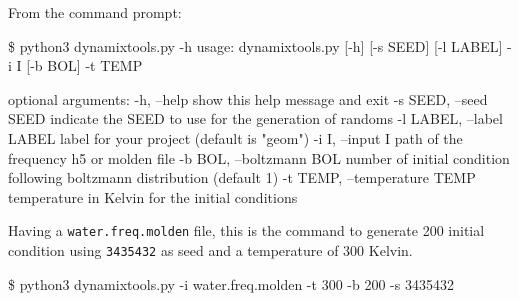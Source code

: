 From the command prompt:
\begin{inputlisting}
\$ python3 dynamixtools.py -h
usage: dynamixtools.py [-h] [-s SEED] [-l LABEL] -i I [-b BOL] -t TEMP

optional arguments:
  -h, --help            show this help message and exit
  -s SEED, --seed SEED  indicate the SEED to use for the generation of randoms
  -l LABEL, --label LABEL
                        label for your project (default is "geom")
  -i I, --input I       path of the frequency h5 or molden file
  -b BOL, --boltzmann BOL
                        number of initial condition following boltzmann
                        distribution (default 1)
  -t TEMP, --temperature TEMP
                        temperature in Kelvin for the initial conditions
\end{inputlisting}

Having a \texttt{water.freq.molden} file, this is the command to generate 200 initial condition using \texttt{3435432} as seed and a temperature of 300 Kelvin.

\begin{inputlisting}
\$ python3 dynamixtools.py -i water.freq.molden -t 300 -b 200 -s 3435432
\end{inputlisting}


